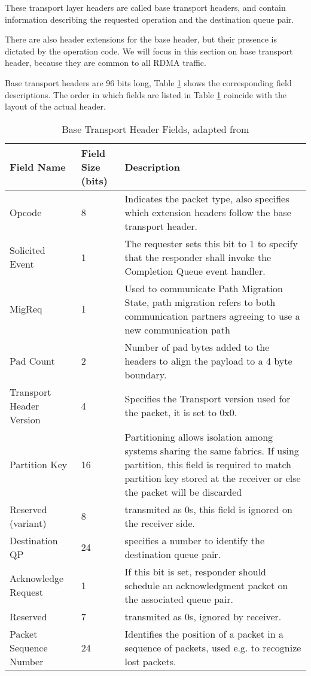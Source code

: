 These transport layer headers are called
base transport headers, and contain information describing the
requested operation and the  destination queue pair.

There are also header extensions for the base header, but their presence is dictated
by the operation code. We will focus in this section on base transport header,
because they are common to all RDMA traffic.

Base transport headers are 96 bits long, Table
\ref{tab:bthfields} shows the corresponding field descriptions. The order in which fields
are listed in Table \ref{tab:bthfields} coincide with the layout of the actual header.

\begin{table}[h]
  \begin{tabular}{| m{10em} | m{3em} | m{15em} |}
    \hline
    Field Name &  Field Size (bits) & Description\\
    \hline
    Opcode & 8 & Indicates the packet type, also specifies which extension headers follow the base transport header.\\
    \hline
    Solicited Event & 1 &  The requester sets this bit to 1 to specify that the responder shall invoke the Completion Queue event handler.\\
    \hline
    MigReq & 1 &  Used to communicate Path Migration State, path migration refers to both communication partners agreeing to use a new communication path\\
    \hline
    Pad Count & 2 &  Number of pad bytes added to the headers to align the payload to a 4 byte boundary.\\
    \hline
    Transport Header Version & 4 &  Specifies the Transport version used for the packet, it is set to 0x0.\\
    \hline
    Partition Key & 16 &  Partitioning allows isolation among systems sharing the same fabrics. If using partition, this field is required to match partition key stored at the receiver or else the packet will be discarded\\
    \hline
    Reserved (variant) & 8 &  transmited as 0s, this field is ignored on the receiver side.\\
    \hline
    Destination QP & 24 &  specifies a number to identify the destination queue pair.\\
    \hline
    Acknowledge Request & 1 &  If this bit is set, responder should schedule an acknowledgment packet on the associated queue pair.\\
    \hline
    Reserved & 7 &  transmited as 0s, ignored by receiver. \\
    \hline
    Packet Sequence Number & 24 &  Identifies the position of a packet in a sequence of packets, used e.g. to recognize lost packets.\\
    \hline
  \end{tabular}
  \caption[Base Transport Header Fields]{Base Transport Header Fields, adapted from\cite{infinibandvol107}}
  \label{tab:bthfields}
\end{table}

